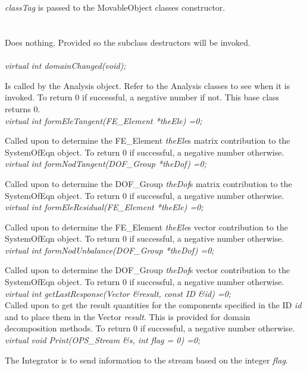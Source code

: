  \\
\\ 
{\em classTag} is passed to the MovableObject classes constructor. \\

 \\
\\ 
Does nothing. Provided so the subclass destructors will be invoked. \\

\\
{\em virtual int domainChanged(void); } 

Is called by the Analysis object. Refer to the Analysis classes to see
when it is invoked. To return $0$ if successful, a negative number if
not. This base class returns $0$.\\

{\em  virtual int formEleTangent(FE\_Element *theEle) =0;} 

Called upon to determine the FE\_Element {\em theEle}s matrix
contribution to the SystemOfEqn object. To return $0$ if successful,
a negative number otherwise. \\ 
 

{\em  virtual int formNodTangent(DOF\_Group *theDof) =0;} 

Called upon to determine the DOF\_Group {\em theDof}s matrix
contribution to the SystemOfEqn object. To return $0$ if successful,
a negative number otherwise. \\ 


{\em  virtual int formEleResidual(FE\_Element *theEle) =0;} 

Called upon to determine the FE\_Element {\em theEle}s vector
contribution to the SystemOfEqn object. To return $0$ if successful,
a negative number otherwise. \\ 


{\em virtual int formNodUnbalance(DOF\_Group *theDof) =0;} 

Called upon to determine the DOF\_Group {\em theDof}s vector
contribution to the SystemOfEqn object. To return $0$ if successful,
a negative number otherwise. \\ 

{\em virtual int getLastResponse(Vector \&result, const ID \&id) =0;} \\
Called upon to get the result quantities for the components specified
in the ID {\em id} and to place them in the Vector {\em result}. This
is provided for domain decomposition methods. To return $0$ if
successful, a negative number otherwise. \\ 

{\em virtual void Print(OPS_Stream \&s, int flag = 0) =0;}

The Integrator is to send information to the stream based on the
integer {\em flag}. 

